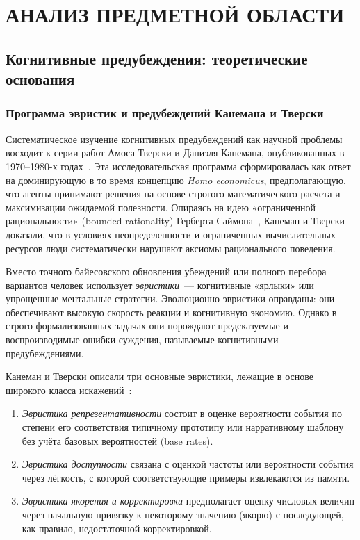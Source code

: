 \chapter{АНАЛИЗ ПРЕДМЕТНОЙ ОБЛАСТИ}

\section{Когнитивные предубеждения: теоретические основания}

\subsection{Программа эвристик и предубеждений Канемана и Тверски}

Систематическое изучение когнитивных предубеждений как научной проблемы восходит к серии работ Амоса Тверски и Даниэля Канемана, опубликованных в 1970--1980-х годах~\cite{tversky1981framing, tversky1983extensional}. Эта исследовательская программа сформировалась как ответ на доминирующую в то время концепцию \textit{Homo economicus}, предполагающую, что агенты принимают решения на основе строгого математического расчета и максимизации ожидаемой полезности. Опираясь на идею «ограниченной рациональности» (bounded rationality) Герберта Саймона~\cite{simon1955behavioral}, Канеман и Тверски доказали, что в условиях неопределенности и ограниченных вычислительных ресурсов люди систематически нарушают аксиомы рационального поведения. 

Вместо точного байесовского обновления убеждений или полного перебора вариантов человек использует \textit{эвристики}~--- когнитивные «ярлыки» или упрощенные ментальные стратегии. Эволюционно эвристики оправданы: они обеспечивают высокую скорость реакции и когнитивную экономию. Однако в строго формализованных задачах они порождают предсказуемые и воспроизводимые ошибки суждения, называемые когнитивными предубеждениями.

Канеман и Тверски описали три основные эвристики, лежащие в основе широкого класса искажений~\cite{kahneman2011thinking}:
\begin{enumerate}
    \item \textit{Эвристика репрезентативности} состоит в оценке вероятности события по степени его соответствия типичному прототипу или нарративному шаблону без учёта базовых вероятностей (base rates).
    \item \textit{Эвристика доступности} связана с оценкой частоты или вероятности события через лёгкость, с которой соответствующие примеры извлекаются из памяти.
    \item \textit{Эвристика якорения и корректировки} предполагает оценку числовых величин через начальную привязку к некоторому значению (якорю) с последующей, как правило, недостаточной корректировкой.
\end{enumerate}

